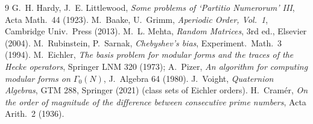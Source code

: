 \documentclass[11pt]{article}
\theoremstyle{remark}
\begin{document}
\begin{thebibliography}{9}\small
{} G.~H. Hardy, J.~E. Littlewood, \emph{Some problems of
`Partitio Numerorum' III}, Acta Math.\ 44 (1923).
 M.~Baake, U.~Grimm, \emph{Aperiodic Order,
Vol.~1}, Cambridge Univ.\ Press (2013).
 M.~L. Mehta, \emph{Random Matrices}, 3rd ed.,
Elsevier (2004).
 M.~Rubinstein, P.~Sarnak,
\emph{Chebyshev's bias}, Experiment.\ Math.\ 3 (1994).
 M.~Eichler, \emph{The basis problem for modular
forms and the traces of the Hecke operators}, Springer LNM 320 (1973);
A.~Pizer, \emph{An algorithm for computing modular forms on
$\Gamma_0(N)$}, J.~Algebra 64 (1980).
 J.~Voight, \emph{Quaternion Algebras}, GTM 288,
Springer (2021) (class sets of Eichler orders).
 H.~Cram\'er, \emph{On the order of magnitude of the
difference between consecutive prime numbers}, Acta Arith.\ 2 (1936).
\end{thebibliography}
\end{document}
